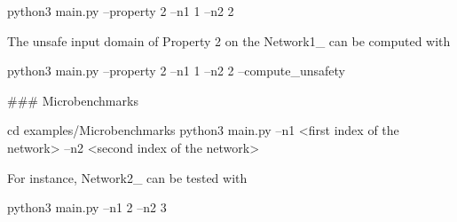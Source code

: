 \begin{DoxyCode}
python3 main.py --property 2 --n1 1 --n2 2
\end{DoxyCode}
 The unsafe input domain of Property 2 on the Network1\+\_ can be computed with 
\begin{DoxyCode}
python3 main.py --property 2 --n1 1 --n2 2 --compute\_unsafety
\end{DoxyCode}


\#\#\# Microbenchmarks 
\begin{DoxyCode}
cd examples/Microbenchmarks
python3 main.py --n1 <first index of the network> --n2 <second index of the network> 
\end{DoxyCode}
 For instance, Network2\+\_ can be tested with


\begin{DoxyCode}
python3 main.py --n1 2 --n2 3
\end{DoxyCode}
 